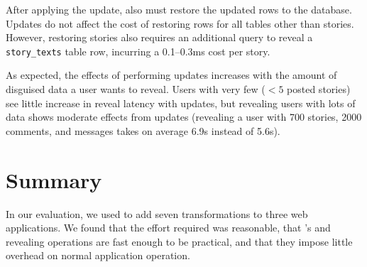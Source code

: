After applying the update, \sys also must restore the updated rows to
the database. Updates do not affect the cost of restoring rows for all tables
other than stories.  However, restoring stories also requires an additional
query to reveal a \texttt{story\_texts} table row, incurring a 0.1--0.3ms cost
per story.

%
As expected, the effects of performing updates increases with the amount of disguised data a
user wants to reveal.
%
Users with very few (\eg $<5$ posted stories) see little increase in reveal
latency with updates, but revealing users with lots of data shows moderate effects
from updates (\eg revealing a user with 700 stories, 2000 comments, and
 messages takes on
average 6.9s instead of 5.6s).

%
\section{Summary}
In our evaluation, we used \sys to add seven \xxing transformations to three web
applications. We found that the effort required was reasonable, that \sys's
\xxing and revealing operations are fast enough to be practical, and that they
impose little overhead on normal application operation.
%
